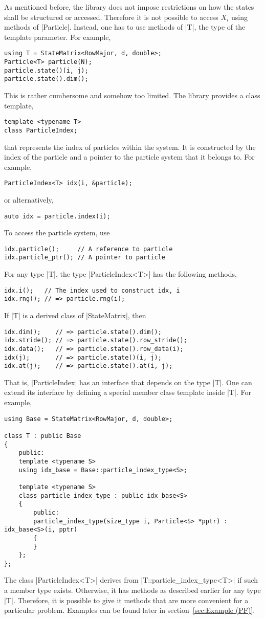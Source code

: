 As mentioned before, the library does not impose restrictions on how the states
shall be structured or accessed. Therefore it is not possible to access $X_i$
using methods of |Particle|. Instead, one has to use methods of |T|, the type
of the template parameter. For example,
\begin{verbatim}
using T = StateMatrix<RowMajor, d, double>;
Particle<T> particle(N);
particle.state()(i, j);
particle.state().dim();
\end{verbatim}
This is rather cumbersome and somehow too limited. The library provides a class
template,
\begin{verbatim}
template <typename T>
class ParticleIndex;
\end{verbatim}
that represents the index of particles within the system. It is constructed by
the index of the particle and a pointer to the particle system that it belongs
to. For example,
\begin{verbatim}
ParticleIndex<T> idx(i, &particle);
\end{verbatim}
or alternatively,
\begin{verbatim}
auto idx = particle.index(i);
\end{verbatim}
To access the particle system, use
\begin{verbatim}
idx.particle();     // A reference to particle
idx.particle_ptr(); // A pointer to particle
\end{verbatim}
For any type |T|, the type |ParticleIndex<T>| has the following methods,
\begin{verbatim}
idx.i();   // The index used to construct idx, i
idx.rng(); // => particle.rng(i);
\end{verbatim}
If |T| is a derived class of |StateMatrix|, then
\begin{verbatim}
idx.dim();    // => particle.state().dim();
idx.stride(); // => particle.state().row_stride();
idx.data();   // => particle.state().row_data(i);
idx(j);       // => particle.state()(i, j);
idx.at(j);    // => particle.state().at(i, j);
\end{verbatim}
That is, |ParticleIndex| has an interface that depends on the type |T|. One can
extend its interface by defining a special member class template inside |T|.
For example,
\begin{verbatim}
using Base = StateMatrix<RowMajor, d, double>;

class T : public Base
{
    public:
    template <typename S>
    using idx_base = Base::particle_index_type<S>;

    template <typename S>
    class particle_index_type : public idx_base<S>
    {
        public:
        particle_index_type(size_type i, Particle<S> *pptr) : idx_base<S>(i, pptr)
        {
        }
    };
};
\end{verbatim}
The class |ParticleIndex<T>| derives from |T::particle_index_type<T>| if such a
member type exists. Otherwise, it has methods as described earlier for any type
|T|. Therefore, it is possible to give it methods that are more convenient for
a particular problem. Examples can be found later in section~\ref{sec:Example
(PF)}.

